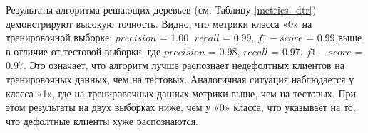 
Результаты алгоритма решающих деревьев (см. Таблицу \ref{metrics_dtr}) демонстрируют высокую точность. Видно, что метрики класса «0» на тренировочной выборке: $precision$ = 1.00, $recall$ = 0.99, $f1-score$ = 0.99 выше в отличие от тестовой выборки, где $precision$ = 0.98, $recall$ = 0.97, $f1-score$ = 0.97. Это означает, что алгоритм лучше распознает недефолтных клиентов на тренировочных данных, чем на тестовых. Аналогичная ситуация наблюдается у класса «1», где на тренировочных данных метрики выше, чем на тестовых. При этом результаты на двух выборках ниже, чем у «0» класса, что указывает на то, что дефолтные клиенты хуже распознаются. 

